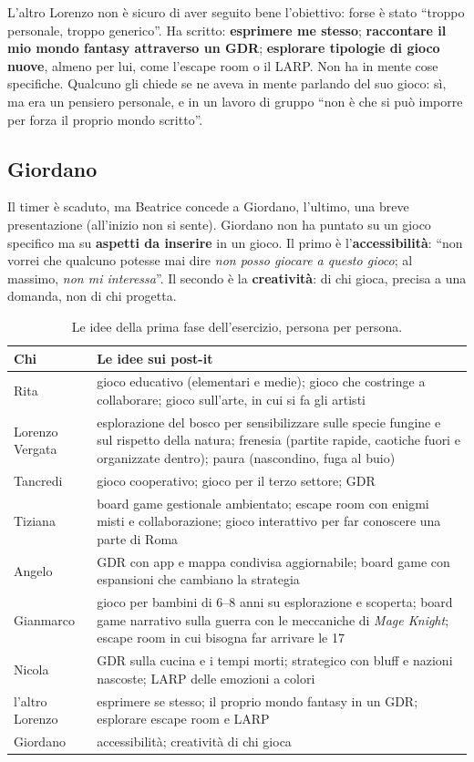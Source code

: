 L'altro Lorenzo non è sicuro di aver seguito bene l'obiettivo: forse è stato
``troppo personale, troppo generico''. Ha scritto: \textbf{esprimere me stesso};
\textbf{raccontare il mio mondo fantasy attraverso un GDR}; \textbf{esplorare
tipologie di gioco nuove}, almeno per lui, come l'escape room o il LARP. Non ha in
mente cose specifiche. Qualcuno gli chiede se ne aveva in mente parlando del suo
gioco: sì, ma era un pensiero personale, e in un lavoro di gruppo ``non è che si può
imporre per forza il proprio mondo scritto''.

\subsection{Giordano}
\label{a7:sec:idee-giordano}

Il timer è scaduto, ma Beatrice concede a Giordano, l'ultimo, una breve presentazione
(all'inizio non si sente). Giordano non ha puntato su un gioco specifico ma su
\textbf{aspetti da inserire} in un gioco. Il primo è l'\textbf{accessibilità}: ``non
vorrei che qualcuno potesse mai dire \emph{non posso giocare a questo gioco}; al
massimo, \emph{non mi interessa}''. Il secondo è la \textbf{creatività}: di chi gioca,
precisa a una domanda, non di chi progetta.

\begin{table}[htbp]
\centering
\small
\begin{tabular}{@{}p{2.3cm}p{10.4cm}@{}}
\toprule
\textbf{Chi} & \textbf{Le idee sui post-it} \\
\midrule
Rita & gioco educativo (elementari e medie); gioco che costringe a collaborare;
gioco sull'arte, in cui si fa gli artisti \\
Lorenzo Vergata & esplorazione del bosco per sensibilizzare sulle specie fungine e
sul rispetto della natura; frenesia (partite rapide, caotiche fuori e organizzate
dentro); paura (nascondino, fuga al buio) \\
Tancredi & gioco cooperativo; gioco per il terzo settore; GDR \\
Tiziana & board game gestionale ambientato; escape room con enigmi misti e
collaborazione; gioco interattivo per far conoscere una parte di Roma \\
Angelo & GDR con app e mappa condivisa aggiornabile; board game con espansioni che
cambiano la strategia \\
Gianmarco & gioco per bambini di 6--8 anni su esplorazione e scoperta; board game
narrativo sulla guerra con le meccaniche di \emph{Mage Knight}; escape room in cui
bisogna far arrivare le 17 \\
Nicola & GDR sulla cucina e i tempi morti; strategico con bluff e nazioni nascoste;
LARP delle emozioni a colori \\
l'altro Lorenzo & esprimere se stesso; il proprio mondo fantasy in un GDR; esplorare
escape room e LARP \\
Giordano & accessibilità; creatività di chi gioca \\
\bottomrule
\end{tabular}
\caption{Le idee della prima fase dell'esercizio, persona per persona.}
\label{a7:tab:idee}
\end{table}


